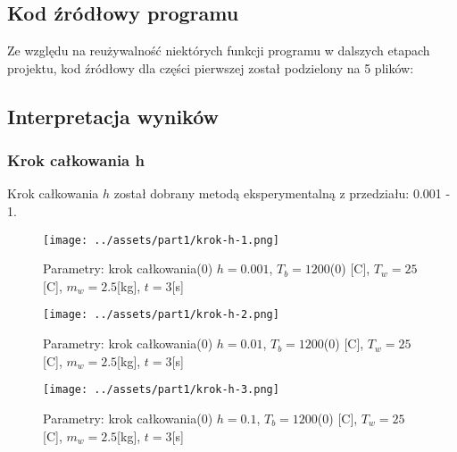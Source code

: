 \documentclass[
	12pt, %
]{fphw}
\begin{document}
\subsection{Kod źródłowy programu}
Ze względu na reużywalność niektórych funkcji programu w dalszych etapach projektu,
kod źródłowy dla części pierwszej został podzielony na 5 plików: \\




\newpage







\newpage

\subsection{Interpretacja wyników}

\subsubsection{Krok całkowania h}
Krok całkowania \(h\) został dobrany metodą eksperymentalną z przedziału: 0.001 - 1.

\begin{figure}[H]
	\texttt{[image: ../assets/part1/krok-h-1.png]}
	\caption{Parametry: krok całkowania(0) \(h = 0.001\), \(T_b = 1200\)(0) [\textdegree{}C], \(T_w = 25\)[\textdegree{}C], \(m_w = 2.5\)[kg], \(t = 3\)[s]}
	\label{fig:krok-1}
\end{figure}

\begin{figure}[H]
	\texttt{[image: ../assets/part1/krok-h-2.png]}
	\caption{Parametry: krok całkowania(0) \(h = 0.01\), \(T_b = 1200\)(0) [\textdegree{}C], \(T_w = 25\)[\textdegree{}C], \(m_w = 2.5\)[kg], \(t = 3\)[s]}
	\label{fig:krok-2}

	\texttt{[image: ../assets/part1/krok-h-3.png]}
	\caption{Parametry: krok całkowania(0) \(h = 0.1\), \(T_b = 1200\)(0) [\textdegree{}C], \(T_w = 25\)[\textdegree{}C], \(m_w = 2.5\)[kg], \(t = 3\)[s]}
	\label{fig:krok-3}
\end{figure}
\end{document}
